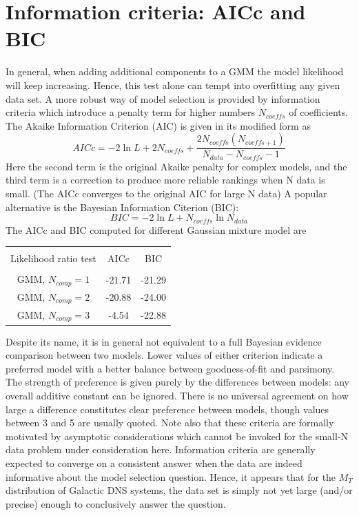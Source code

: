 \documentclass[journal,12pt,twocolumn]{IEEEtran}
\begin{document}
\section{Information criteria: AICc and BIC}
In general, when adding additional components to a GMM the model likelihood will keep increasing. Hence, this test alone can tempt into overfitting any given data set. A more robust way of model selection is provided by information criteria which introduce a penalty term for higher numbers $N_{coeffs}$ of coefficients.
The Akaike Information Criterion (AIC) is given in its modified form as
\begin{equation}
	AICc = -2\ln L + 2N_{coeffs} + \frac{2 N_{coeffs} \left(N_{coeffs + 1}\right)}{N_{data}-N_{coeffs}-1}
\end{equation}
Here the second term is the original Akaike penalty for complex models, and the third term is a correction to produce more reliable rankings when N data is small. (The AICc converges to the original AIC for large N data) A popular alternative is the Bayesian Information Citerion (BIC):
\begin{equation}
	BIC = -2\ln L + N_{coeffs} \ln N_{data}
\end{equation}
The AICc and BIC computed for different Gaussian mixture model are
\begin{center}
\begin{tabular}{|c|c|c|}
\hline
& & \\
Likelihood ratio test & AICc & BIC\\
& & \\
\hline
GMM, $N_{comp} = 1$ & -21.71 & -21.29 \\
\hline
GMM, $N_{comp} = 2$ & -20.88 & -24.00 \\
\hline
GMM, $N_{comp} = 3$ & -4.54 & -22.88 \\
\hline
\end{tabular}
\end{center}
Despite its name, it is in general not equivalent to a full Bayesian evidence comparison between two models. Lower values of either criterion indicate a preferred model with a better balance between goodness-of-fit and parsimony. The strength of preference is given purely by the differences between models: any overall additive constant can be ignored. There is no universal agreement on how large a difference constitutes clear preference between models, though values between 3 and 5 are usually quoted. Note also that these criteria are formally motivated by asymptotic considerations which cannot be invoked for the small-N data problem under consideration here. Information criteria are generally expected to converge on a consistent answer when the data are indeed informative about the model selection question. Hence, it appears that for the $M_T$ distribution of Galactic DNS systems, the data set is simply not yet large (and/or precise) enough to conclusively answer the question.
\end{document}
